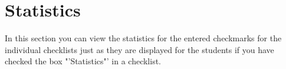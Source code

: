 \section{Statistics}

In this section you can view the statistics for the entered checkmarks for the individual checklists just as they are displayed for the students if you have checked the box "'Statistics"' in a checklist.